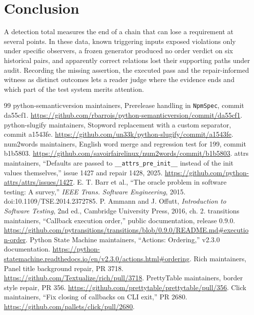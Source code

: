 \documentclass[conference]{IEEEtran}
\begin{document}
\section{Conclusion}
A detection total measures the end of a chain that can lose a requirement at several points. In these data, known triggering inputs exposed violations only under specific observers, a frozen generator produced no order verdict on six historical pairs, and apparently correct relations lost their supporting paths under audit. Recording the missing assertion, the executed pass and the repair-informed witness as distinct outcomes lets a reader judge where the evidence ends and which part of the test system merits attention.

\begin{thebibliography}{99}
 python-semanticversion maintainers, Prerelease handling in \texttt{NpmSpec}, commit da55cf1. \url{https://github.com/rbarrois/python-semanticversion/commit/da55cf1}.
 python-slugify maintainers, Stopword replacement with a custom separator, commit a1543fe. \url{https://github.com/un33k/python-slugify/commit/a1543fe}.
 num2words maintainers, English word merge and regression test for 199, commit b1b5803. \url{https://github.com/savoirfairelinux/num2words/commit/b1b5803}.
 attrs maintainers, ``Defaults are passed to \texttt{\_\_attrs\_pre\_init\_\_} instead of the init values themselves,'' issue 1427 and repair 1428, 2025. \url{https://github.com/python-attrs/attrs/issues/1427}.
 E. T. Barr et al., ``The oracle problem in software testing: A survey,'' \emph{IEEE Trans. Software Engineering}, 2015. doi:10.1109/TSE.2014.2372785.
 P. Ammann and J. Offutt, \emph{Introduction to Software Testing}, 2nd ed., Cambridge University Press, 2016, ch. 2.
 transitions maintainers, ``Callback execution order,'' public documentation, release 0.9.0. \url{https://github.com/pytransitions/transitions/blob/0.9.0/README.md#execution-order}.
 Python State Machine maintainers, ``Actions: Ordering,'' v2.3.0 documentation. \url{https://python-statemachine.readthedocs.io/en/v2.3.0/actions.html#ordering}.
 Rich maintainers, Panel title background repair, PR 3718. \url{https://github.com/Textualize/rich/pull/3718}.
 PrettyTable maintainers, border style repair, PR 356. \url{https://github.com/prettytable/prettytable/pull/356}.
 Click maintainers, ``Fix closing of callbacks on CLI exit,'' PR 2680. \url{https://github.com/pallets/click/pull/2680}.

\end{thebibliography}
\end{document}
